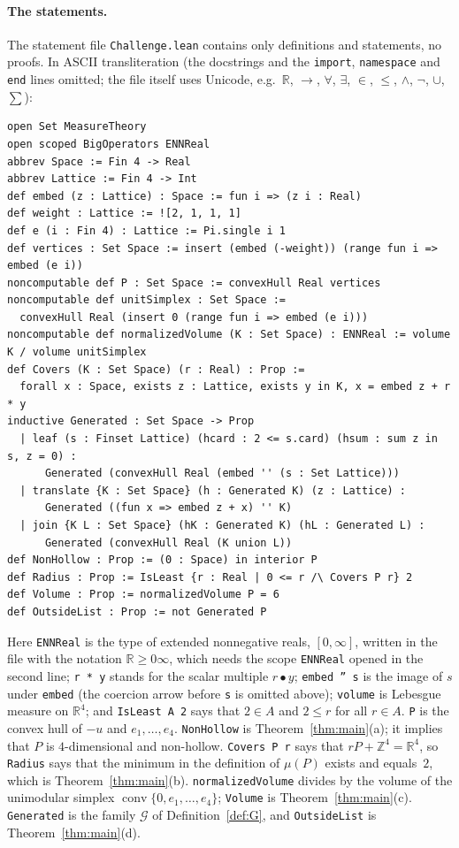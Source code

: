\documentclass[11pt]{article}
\theoremstyle{definition}
\theoremstyle{remark}
\newcommand{\R}{\mathbb R}
\newcommand{\Z}{\mathbb Z}
\newcommand{\conv}{\operatorname{conv}}
\newcommand{\G}{\mathcal G}
\begin{document}
{\paragraph{The statements.}
The statement file \texttt{Challenge.lean} contains only definitions and
statements, no proofs. In ASCII transliteration (the docstrings and the
\texttt{import}, \texttt{namespace} and \texttt{end} lines omitted; the file
itself uses Unicode, e.g.\ $\mathbb R$, $\to$, $\forall$, $\exists$, $\in$,
$\le$, $\wedge$, $\neg$, $\cup$, $\sum$):
{\footnotesize
\begin{verbatim}
open Set MeasureTheory
open scoped BigOperators ENNReal
abbrev Space := Fin 4 -> Real
abbrev Lattice := Fin 4 -> Int
def embed (z : Lattice) : Space := fun i => (z i : Real)
def weight : Lattice := ![2, 1, 1, 1]
def e (i : Fin 4) : Lattice := Pi.single i 1
def vertices : Set Space := insert (embed (-weight)) (range fun i => embed (e i))
noncomputable def P : Set Space := convexHull Real vertices
noncomputable def unitSimplex : Set Space :=
  convexHull Real (insert 0 (range fun i => embed (e i)))
noncomputable def normalizedVolume (K : Set Space) : ENNReal := volume K / volume unitSimplex
def Covers (K : Set Space) (r : Real) : Prop :=
  forall x : Space, exists z : Lattice, exists y in K, x = embed z + r * y
inductive Generated : Set Space -> Prop
  | leaf (s : Finset Lattice) (hcard : 2 <= s.card) (hsum : sum z in s, z = 0) :
      Generated (convexHull Real (embed '' (s : Set Lattice)))
  | translate {K : Set Space} (h : Generated K) (z : Lattice) :
      Generated ((fun x => embed z + x) '' K)
  | join {K L : Set Space} (hK : Generated K) (hL : Generated L) :
      Generated (convexHull Real (K union L))
def NonHollow : Prop := (0 : Space) in interior P
def Radius : Prop := IsLeast {r : Real | 0 <= r /\ Covers P r} 2
def Volume : Prop := normalizedVolume P = 6
def OutsideList : Prop := not Generated P
\end{verbatim}}
\noindent Here \texttt{ENNReal} is the type of extended nonnegative reals,
$[0,\infty]$, written in the file with the notation
$\mathbb R{\ge}0\infty$, which needs the scope
\texttt{ENNReal} opened in the second line; \texttt{r * y} stands for the
scalar multiple $r\bullet y$; \texttt{embed '' s} is the image of $s$ under \texttt{embed}
(the coercion arrow before \texttt{s} is omitted above); \texttt{volume} is
Lebesgue measure on $\R^4$; and \texttt{IsLeast A 2} says that $2\in A$ and
$2\le r$ for all $r\in A$. \texttt{P} is the convex hull of $-u$ and
$e_1,\dots,e_4$. \texttt{NonHollow} is Theorem~\ref{thm:main}(a); it implies
that $P$ is $4$-dimensional and non-hollow. \texttt{Covers P r} says that
$rP+\Z^4=\R^4$, so \texttt{Radius} says that the minimum in the definition of
$\mu(P)$ exists and equals~$2$, which is Theorem~\ref{thm:main}(b).
\texttt{normalizedVolume} divides by the volume of the unimodular simplex
$\conv\{0,e_1,\dots,e_4\}$; \texttt{Volume} is Theorem~\ref{thm:main}(c).
\texttt{Generated} is the family $\G$ of Definition~\ref{def:G}, and
\texttt{OutsideList} is Theorem~\ref{thm:main}(d).

}
\end{document}
